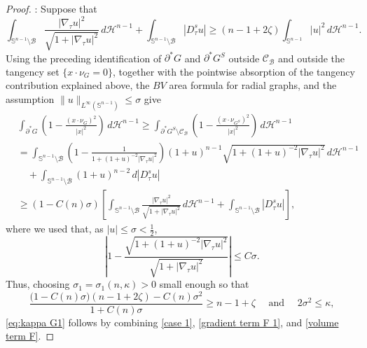 \documentclass[reqno,11pt]{amsart}
\def\kz{\kappa}
\def\sz{\sigma}
\numberwithin{equation}{section}
\theoremstyle{remark}
\begin{document}
\begin{proof}
\medskip
{}: 
Suppose that
\begin{equation}\label{case 1}
    \int_{\mathbb S^{n-1}\setminus \mathcal B}  \frac{|\nabla_\tau  u|^2}{\sqrt{1+ |\nabla_\tau u|^2}} \,d\mathscr H^{n-1} + \int_{\mathbb S^{n-1}\setminus \mathcal B}|D^s_\tau u|\geq  \left(n-1+2 \zeta\right)  \int_{\mathbb S^{n-1}} {|u|^2} \,d\mathscr H^{n-1}.
\end{equation} 
Using the preceding identification of $\partial^*G$ and $\partial^*G^S$ outside
$\mathcal C_{\mathcal B}$ and outside the tangency set
$\{x\cdot\nu_G=0\}$, together with the pointwise absorption of the tangency
contribution explained above,   the $BV$ area formula for radial graphs, and the assumption
$\|u\|_{L^\infty(\mathbb S^{n-1})}\le \sz$ give
\begin{align}
 &  \int_{\partial^* G }  \left(1-\frac{(x\cdot \nu_G)^2}{|x|^2}\right) \, d\mathscr H^{n-1} 
\ge  \int_{\partial^* G^S  \setminus \mathcal{C}_{\mathcal B}}  \left(1-\frac{(x\cdot \nu_{G^S} )^2}{|x|^2}\right) \, d\mathscr H^{n-1}\nonumber \\ 
&= \int_{\mathbb S^{n-1}\setminus \mathcal B}  \left(1- \frac{1}{ 1+(1+u)^{-2}|\nabla_\tau u|^2 }\right)(1+u)^{n-1}\sqrt{1+(1+u)^{-2} |\nabla_\tau u|^2} \, d\mathscr H^{n-1} \nonumber\\
&\quad + \int_{\mathbb S^{n-1}\setminus \mathcal B}(1+u)^{n-2}\,d|D^s_\tau u|\nonumber \\
& \ge (1-C(n)\sz) \left[\int_{\mathbb S^{n-1}\setminus \mathcal B} \frac{|\nabla_\tau u|^2}{\sqrt{1+|\nabla_\tau u|^2}}   \, d\mathscr H^{n-1} + \int_{\mathbb S^{n-1}\setminus \mathcal B}|D^s_\tau u|\right], \label{gradient term F 1}
\end{align}
where we used that, as $|u|\le \sz<\frac 1 2$,
$$\left|1-\frac{\sqrt{1+(1+u)^{-2} |\nabla_\tau u|^2}}{\sqrt{1+ |\nabla_\tau u|^2}}\right|\le C \sz.$$
Thus, choosing $\sz_1=\sz_1(n,\kz)>0 $ small enough so that
$$
\frac{\bigl(1-C(n)\sz\bigr)(n-1+2\zeta)-C(n)\sigma^2}{1+C(n)\sz}\ge n-1+\zeta  \quad \text{ and } \quad 2\sz^2\le \kz,
$$
\eqref{eq:kappa G1} follows by combining \eqref{case 1}, \eqref{gradient term F 1}, and \eqref{volume term F}. 



\end{proof}
\end{document}
